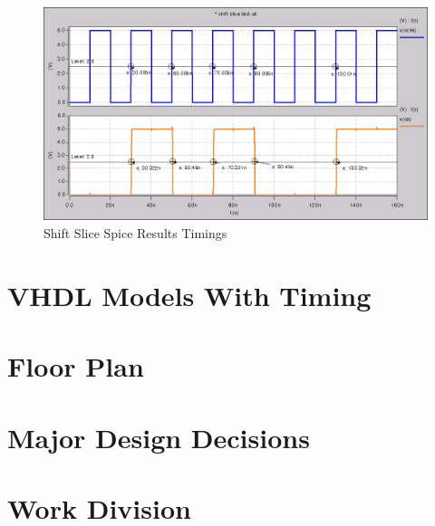         \begin{figure}[H]
            \centering
            \includegraphics[width=0.75\linewidth]{../../spice/shift_slice_all_annotated.png}
            \caption{Shift Slice Spice Results Timings}
        \end{figure}

\section{VHDL Models With Timing}
\section{Floor Plan}
\section{Major Design Decisions}
\section{Work Division}

